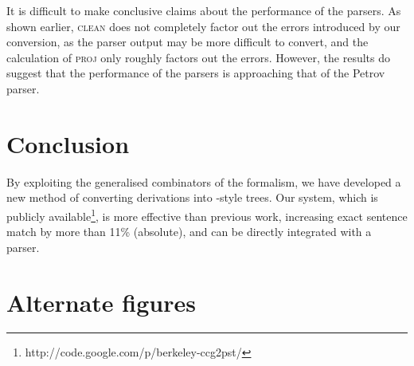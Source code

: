 It is difficult to make conclusive claims about the performance of the parsers.
As shown earlier, \textsc{clean} does not completely factor out the errors
introduced by our conversion, as the parser output may be more difficult to
convert, and the calculation of \textsc{proj} only roughly factors out the
errors.  However, the results do suggest that the performance of the \ccg
parsers is approaching that of the Petrov parser.

\section{Conclusion}

By exploiting the generalised combinators of the \ccg formalism, we have
developed a new method of converting \ccg derivations into \ptb-style trees.
Our system, which is publicly
available\footnote{http://code.google.com/p/berkeley-ccg2pst/}, is more
effective than previous work, increasing exact sentence match by more than 11\%
(absolute), and can be directly integrated with a \ccg parser.

\section{Alternate figures}


